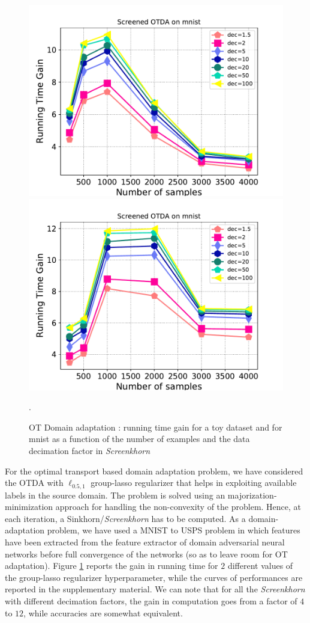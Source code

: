 \begin{figure}[t]
	\centering

	\includegraphics[width=6.cm]{./figs/da_gain_mnist_regcl1.pdf}
	\includegraphics[width=6.cm]{./figs/da_gain_mnist_regcl10.pdf}
	\caption{OT Domain adaptation : running time gain for a toy dataset and for mnist as a function of the number of examples and the data decimation factor in \emph{Screenkhorn}}.
	\label{fig:otda}
\end{figure}

For the optimal transport based domain adaptation problem, we have considered the
OTDA with $\ell_{0.5,1}$ group-lasso regularizer that helps in exploiting available labels in the source domain. The problem is solved using an majorization-minimization approach 
for handling the non-convexity of the problem. Hence, at each iteration, a Sinkhorn/\emph{Screenkhorn} has to be computed. As a domain-adaptation problem, we have
used a MNIST to USPS problem in which features have been extracted from the
feature extractor of domain adversarial neural networks \citep{ganin2016domain} before full convergence of the networks (so as to leave room for OT adaptation). 
Figure \ref{fig:otda} reports the gain in running time for $2$ different values
of the group-lasso regularizer hyperparameter, while the curves of performances are
reported in the supplementary material. We can note that for all the  \emph{Screenkhorn} with different decimation factors, the gain in computation goes from a factor of $4$ to $12$, while accuracies are somewhat equivalent.



